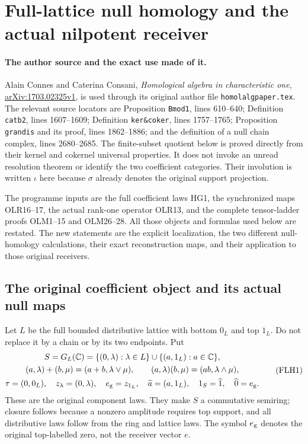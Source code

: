\section{Full-lattice null homology and the actual nilpotent receiver}
\label{sec:FLH}

\paragraph{The author source and the exact use made of it.}
Alain Connes and Caterina Consani,
\emph{Homological algebra in characteristic one},
\href{https://arxiv.org/abs/1703.02325v1}{arXiv:1703.02325v1},
is used through its original author file
\nolinkurl{homolalgpaper.tex}. The relevant source locators are
Proposition \texttt{Bmod1}, lines 610--640; Definition
\texttt{catb2}, lines 1607--1609; Definition
\texttt{ker\&coker}, lines 1757--1765; Proposition
\texttt{grandis} and its proof, lines 1862--1886; and the
definition of a null chain complex, lines 2680--2685.
The finite-subset quotient below is proved directly from their
kernel and cokernel universal properties. It does not invoke an
unread resolution theorem or identify the two coefficient categories.
Their involution is written \(\iota\) here because \(\sigma\)
already denotes the original support projection.

The programme inputs are the full coefficient laws HG1,
the synchronized maps OLR16--17, the actual rank-one operator
OLR13, and the complete tensor-ladder proofs OLM1--15 and
OLM26--28. All those objects and formulas used below are restated.
The new statements are the explicit localization, the two
different null-homology calculations, their exact reconstruction
maps, and their application to those original receivers.

\subsection{The original coefficient object and its actual null maps}

Let \(L\) be the full bounded distributive lattice with bottom
\(0_L\) and top \(1_L\). Do not replace it by a chain or by its
two endpoints. Put
\[
\begin{gathered}
S=G_L(\mathbb C)
 =\{(0,\lambda):\lambda\in L\}
       \cup\{(a,1_L):a\in\mathbb C\},\\
(a,\lambda)+(b,\mu)=(a+b,\lambda\vee\mu),\qquad
(a,\lambda)(b,\mu)=(ab,\lambda\wedge\mu),\\
\tau=(0,0_L),\quad z_\lambda=(0,\lambda),\quad
e_{\rm g}=z_{1_L},\quad \widehat a=(a,1_L),\quad
1_S=\widehat1,\quad \widehat0=e_{\rm g}.
\end{gathered}\tag{FLH1}
\]
These are the original component laws. They make \(S\) a
commutative semiring; closure follows because a nonzero
amplitude requires top support, and all distributive laws follow
from the ring and lattice laws. The symbol \(e_{\rm g}\) denotes
the original top-labelled zero, not the receiver vector \(e\).

